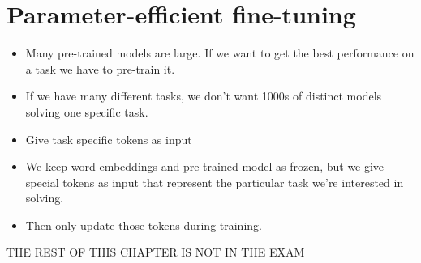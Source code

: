 \documentclass[11pt]{article}
\begin{document}
\section{Parameter-efficient fine-tuning}

\begin{minipage}[l]{.5\linewidth}
    \begin{figure}[H]
        \centering
    \end{figure}    
\end{minipage}\hfill
\begin{minipage}[r]{.48\linewidth}
    \begin{itemize}
        \item Many pre-trained models are large. If we want to get the best performance on a task we have to pre-train it.
        \item If we have many different tasks, we don't want 1000s of distinct models solving one specific task.
    \end{itemize}
\end{minipage}

\begin{minipage}[l]{.5\linewidth}
    \begin{figure}[H]
        \centering
    \end{figure}    
\end{minipage}\hfill
\begin{minipage}[r]{.48\linewidth}
    \begin{itemize}
        \item Give task specific tokens as input
        \item We keep word embeddings and pre-trained model as frozen, but we give special tokens as input that represent the particular task we're interested in solving. 
        \item Then only update those tokens during training.
    \end{itemize}
\end{minipage}

THE REST OF THIS CHAPTER IS NOT IN THE EXAM 

\end{document}
